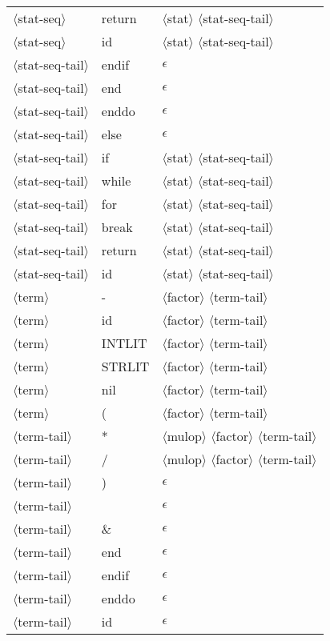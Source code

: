 \documentclass[11pt, fleqn]{article}
\newcommand{\atag}[1]{$\langle$#1$\rangle$}
\begin{document}
\begin{longtable}{l|l|l}
\atag{stat-seq}					&	return	&	\atag{stat} \atag{stat-seq-tail}		\\
\atag{stat-seq}					&	id		&	\atag{stat} \atag{stat-seq-tail}		\\
\atag{stat-seq-tail}				&	endif		&	$\epsilon$	\\
\atag{stat-seq-tail}				&	end			&	$\epsilon$	\\
\atag{stat-seq-tail}				&	enddo		&	$\epsilon$	\\
\atag{stat-seq-tail}				&	else			&	$\epsilon$	\\
\atag{stat-seq-tail}				&	if			&	\atag{stat} \atag{stat-seq-tail}	\\
\atag{stat-seq-tail}				&	while			&	\atag{stat} \atag{stat-seq-tail}	\\
\atag{stat-seq-tail}				&	for			&	\atag{stat} \atag{stat-seq-tail}	\\
\atag{stat-seq-tail}				&	break			&	\atag{stat} \atag{stat-seq-tail}	\\
\atag{stat-seq-tail}				&	return			&	\atag{stat} \atag{stat-seq-tail}	\\
\atag{stat-seq-tail}				&	id			&	\atag{stat} \atag{stat-seq-tail}	\\
\atag{term}				&	-		&	\atag{factor} \atag{term-tail}		\\
\atag{term}				&	id		&	\atag{factor} \atag{term-tail}		\\
\atag{term}				&	INTLIT	&	\atag{factor} \atag{term-tail}		\\
\atag{term}				&	STRLIT	&	\atag{factor} \atag{term-tail}		\\
\atag{term}				&	nil		&	\atag{factor} \atag{term-tail}		\\
\atag{term}				&	(		&	\atag{factor} \atag{term-tail}		\\
\atag{term-tail}					&	*		&	\atag{mulop} \atag{factor} \atag{term-tail}		\\
\atag{term-tail}					&	/		&	\atag{mulop} \atag{factor} \atag{term-tail}		\\
\atag{term-tail}					&	)		&	$\epsilon$		\\
\atag{term-tail}					&	\textbar		&	$\epsilon$		\\
\atag{term-tail}					&	\&		&	$\epsilon$		\\
\atag{term-tail}					&	end		&	$\epsilon$		\\
\atag{term-tail}					&	endif	&	$\epsilon$		\\
\atag{term-tail}					&	enddo	&	$\epsilon$		\\
\atag{term-tail}					&	id		&	$\epsilon$		\\

\end{longtable}
\end{document}
